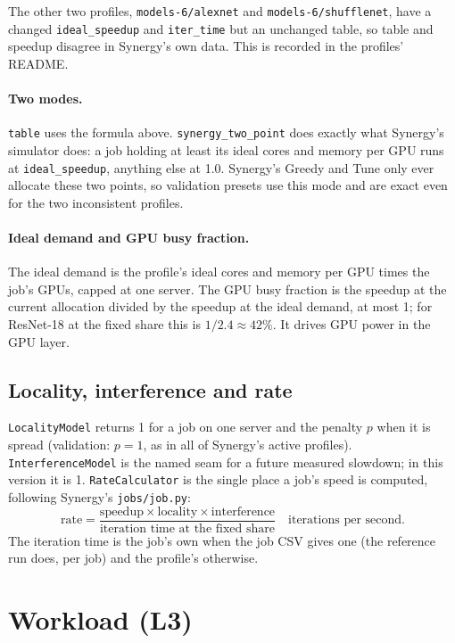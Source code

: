 \documentclass[11pt,a4paper]{article}
\newcommand{\code}[1]{\texttt{#1}}
\begin{document}
The other two profiles, \code{models-6/alexnet} and \code{models-6/shufflenet}, have a changed
\code{ideal\_speedup} and \code{iter\_time} but an unchanged table, so table and speedup disagree in
Synergy's own data. This is recorded in the profiles' README.

\paragraph{Two modes.} \code{table} uses the formula above. \code{synergy\_two\_point} does exactly what
Synergy's simulator does: a job holding at least its ideal cores and memory per GPU runs at
\code{ideal\_speedup}, anything else at 1.0. Synergy's Greedy and Tune only ever allocate these two
points, so validation presets use this mode and are exact even for the two inconsistent profiles.

\paragraph{Ideal demand and GPU busy fraction.} The ideal demand is the profile's ideal cores and
memory per GPU times the job's GPUs, capped at one server. The GPU busy fraction is the speedup at the
current allocation divided by the speedup at the ideal demand, at most 1; for ResNet-18 at the fixed
share this is $1/2.4 \approx 42\%$. It drives GPU power in the GPU layer.

\subsection{Locality, interference and rate}
\code{LocalityModel} returns 1 for a job on one server and the penalty $p$ when it is spread
(validation: $p = 1$, as in all of Synergy's active profiles). \code{InterferenceModel} is the named
seam for a future measured slowdown; in this version it is 1. \code{RateCalculator} is the single
place a job's speed is computed, following Synergy's \code{jobs/job.py}:
\[
  \text{rate} = \frac{\text{speedup} \times \text{locality} \times \text{interference}}{\text{iteration time at the fixed share}}
  \quad \text{iterations per second.}
\]
The iteration time is the job's own when the job CSV gives one (the reference run does, per job) and
the profile's otherwise.

\section{Workload (L3)}
\end{document}

